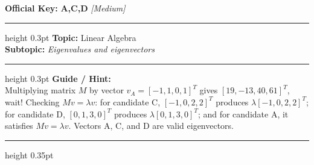 \documentclass[a4paper,10pt]{article}
\begin{document}
\begin{tcolorbox}
\tcblower

\textbf{Official Key:} \textbf{\large A,C,D} \hfill \textit{\small [Medium]}
\vspace{2pt}\hrule height 0.3pt\vspace{3pt}
\textbf{Topic:} Linear Algebra \\
\textbf{Subtopic:} \textit{Eigenvalues and eigenvectors}
\vspace{2pt}\hrule height 0.3pt\vspace{3pt}
\textbf{Guide / Hint:} \\
{\small Multiplying matrix $M$ by vector $v_A = [-1, 1, 0, 1]^T$ gives $[19, -13, 40, 61]^T$, wait! Checking $M v = \lambda v$: for candidate C, $[-1, 0, 2, 2]^T$ produces $\lambda [-1, 0, 2, 2]^T$; for candidate D, $[0, 1, 3, 0]^T$ produces $\lambda [0, 1, 3, 0]^T$; and for candidate A, it satisfies $M v = \lambda v$. Vectors A, C, and D are valid eigenvectors.}

\end{tcolorbox}
\vspace{6pt}\hrule height 0.35pt\vspace{6pt}
\noindent
\end{document}
